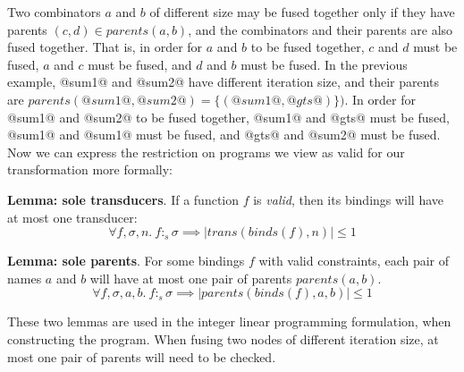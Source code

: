 Two combinators $a$ and $b$ of different size may be fused together only if they have parents $(c, d) \in parents(a,b)$, and the combinators and their parents are also fused together.
That is, in order for $a$ and $b$ to be fused together, $c$ and $d$ must be fused, $a$ and $c$ must be fused, and $d$ and $b$ must be fused.
In the previous example, @sum1@ and @sum2@ have different iteration size, and their parents are $parents(@sum1@, @sum2@) = \{(@sum1@, @gts@)\})$.
In order for @sum1@ and @sum2@ to be fused together, @sum1@ and @gts@ must be fused, @sum1@ and @sum1@ must be fused, and @gts@ and @sum2@ must be fused. Now we can express the restriction on programs we view as valid for our transformation more formally:

\textbf{Lemma: sole transducers}.
If a function $f$ is \emph{valid}, then its bindings will have at most one transducer:
\[
\forall f, \sigma, n.\ f :_s \sigma \implies |trans(binds(f), n)| \le 1
\]

 
\textbf{Lemma: sole parents}.
For some bindings $f$ with valid constraints, each pair of names $a$ and $b$ will have at most one pair of parents $parents(a,b)$.
\[
\forall f, \sigma, a, b.\ f :_s \sigma \implies |parents(binds(f), a, b)| \le 1
\]

These two lemmas are used in the integer linear programming formulation, when constructing the program.
When fusing two nodes of different iteration size, at most one pair of parents will need to be checked.

